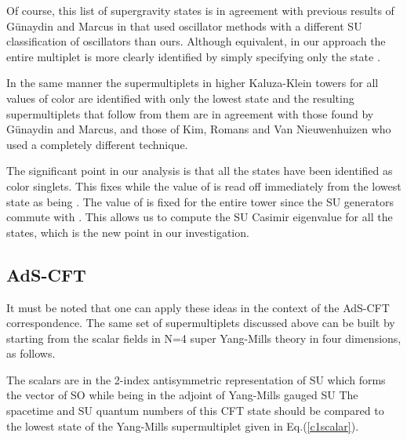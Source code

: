\documentclass[a4paper,aps,preprint,nofootinbib]{revtex4}
\begin{document}
Of course, this list of supergravity states is in agreement with previous
results of G\"{u}naydin and Marcus in \cite{barsgunaydin} that used
oscillator methods with a different SU\myHighlight{$\left( 4\right) $}\coordHE{} classification of
oscillators than ours. Although equivalent, in our approach the entire
multiplet is more clearly identified by simply specifying only the \coordHE{}
state \coordHE{}.

In the same manner the supermultiplets in higher Kaluza-Klein towers for all
values of color \coordHE{} are identified with only the lowest state \coordHE{} and the resulting supermultiplets that follow from them
are in agreement with those found by G\"{u}naydin and Marcus, and those of
Kim, Romans and Van Nieuwenhuizen \cite{KRN} who used a completely different
technique.

The significant point in our analysis is that all the states have been
identified as color singlets. This fixes \coordHE{} while
the value of \myHighlight{$\Delta$}\coordHE{} is read off immediately from the lowest state \coordHE{} as being \coordHE{}. The value of \myHighlight{$\Delta$}\coordHE{} is fixed
for the entire tower since the SU\coordHE{} generators commute
with \myHighlight{$\Delta$}\coordHE{}. This allows us to compute the SU\coordHE{} Casimir
eigenvalue for all the states, which is the new point in our investigation.

\subsection{AdS-CFT}

It must be noted that one can apply these ideas in the context of the
AdS-CFT correspondence. The same set of supermultiplets discussed above can
be built by starting from the scalar fields \myHighlight{$\phi^{\left[ ab\right] }$}\coordHE{} in
N=4 super Yang-Mills theory in four dimensions, as follows.

The scalars \myHighlight{$\phi^{\left[ ab\right] }$}\coordHE{} are in the 2-index antisymmetric
representation of SU\myHighlight{$\left( 4\right) $}\coordHE{} which forms the vector of SO\myHighlight{$\left(
6\right) ,$}\coordHE{} while being in the adjoint of Yang-Mills gauged SU\coordHE{} The spacetime and SU\myHighlight{$\left( 4\right) $}\coordHE{} quantum numbers of this
CFT state should be compared to the \coordHE{} lowest state \coordHE{}
of the Yang-Mills supermultiplet given in Eq.(\ref{c1scalar}).
\end{document}
